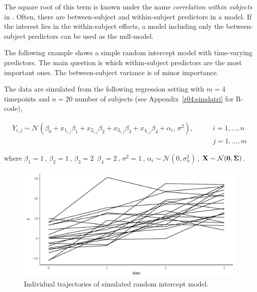 \documentclass[11pt,a4paper,twoside]{book}
\newenvironment{knitrout}{}{} %
\begin{document}
The square root of this term is known under the name \textit{correlation within subjects} in \cite{Bland1995}. Often, there are between-subject and within-subject predictors in a model. If the interest lies in the within-subject effects,  a model including only the between-subject predictors can be used as the null-model.

The following example shows a simple random intercept model with time-varying predictors. The main question is which within-subject predictors are the most important ones. The between-subject variance is of minor importance. 

The data are simulated from the following regression setting with $m = 4$ timepoints and $n = 20$ number of subjects (see Appendix~\ref{r04:simdatri} for R-code),

\begin{align*} 
Y_{i,j} \sim \mathcal{N}(\beta_{0}+x_{1_{i,j}} \beta_{1}+x_{2_{i,j}} \beta_{2}+x_{3_{i,j}} \beta_{3}+x_{4_{i,j}} \beta_{4} + \alpha_{i}, \, \sigma^2), \qquad &i = 1, \dots, n \\  &j = 1, \dots, m
\end{align*} 

where $\beta_{1} = 1 \,$,  $\beta_{2} = 1 \,$,   $\beta_{3} = 2 \,$  $\beta_{4}=2 \,$, $\sigma^2 = 1 \, $, $\alpha_{i} \sim \mathcal{N}(0, \sigma_{\alpha}^2) \,$, ${\mathbf{X}} \sim \mathcal{N}({\mathbf{0}}, {\boldsymbol{\Sigma}}{})$.



\begin{knitrout}
\color{fgcolor}\begin{figure}

{\centering \includegraphics[width=\textwidth-3cm]{figure/ch04_fig_repeated_plot_ri-1} 

}

\caption[Individual trajectories of simulated random intercept model]{Individual trajectories of simulated random intercept model.}\label{fig:.repeated.plot.ri}
\end{figure}


\end{knitrout}
\end{document}
